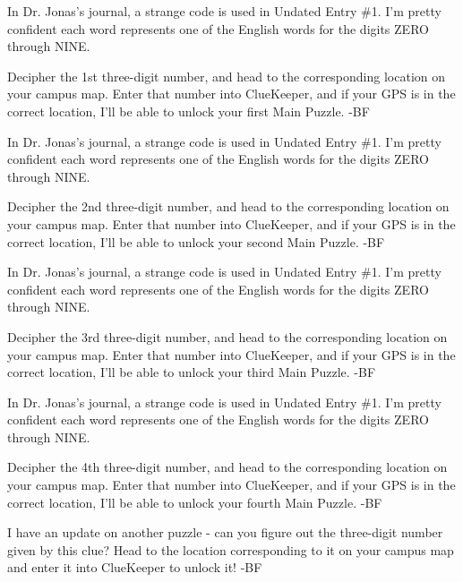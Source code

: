 
In Dr. Jonas's journal, a strange code is used in
Undated Entry \#1. I'm pretty confident each word
represents one of the English words for the
digits ZERO through NINE.

Decipher the 1st three-digit number, and head
to the corresponding location on your campus map.
Enter that number into ClueKeeper, and if your GPS
is in the correct location, I'll be able to unlock
your first Main Puzzle. -BF


In Dr. Jonas's journal, a strange code is used in
Undated Entry \#1. I'm pretty confident each word
represents one of the English words for the
digits ZERO through NINE.

Decipher the 2nd three-digit number, and head
to the corresponding location on your campus map.
Enter that number into ClueKeeper, and if your GPS
is in the correct location, I'll be able to unlock
your second Main Puzzle. -BF


In Dr. Jonas's journal, a strange code is used in
Undated Entry \#1. I'm pretty confident each word
represents one of the English words for the
digits ZERO through NINE.

Decipher the 3rd three-digit number, and head
to the corresponding location on your campus map.
Enter that number into ClueKeeper, and if your GPS
is in the correct location, I'll be able to unlock
your third Main Puzzle. -BF


In Dr. Jonas's journal, a strange code is used in
Undated Entry \#1. I'm pretty confident each word
represents one of the English words for the
digits ZERO through NINE.

Decipher the 4th three-digit number, and head
to the corresponding location on your campus map.
Enter that number into ClueKeeper, and if your GPS
is in the correct location, I'll be able to unlock
your fourth Main Puzzle. -BF


I have an update on another puzzle - can you
figure out the three-digit number given by
this clue? Head to the location corresponding
to it on your campus map and enter it into
ClueKeeper to unlock it! -BF

